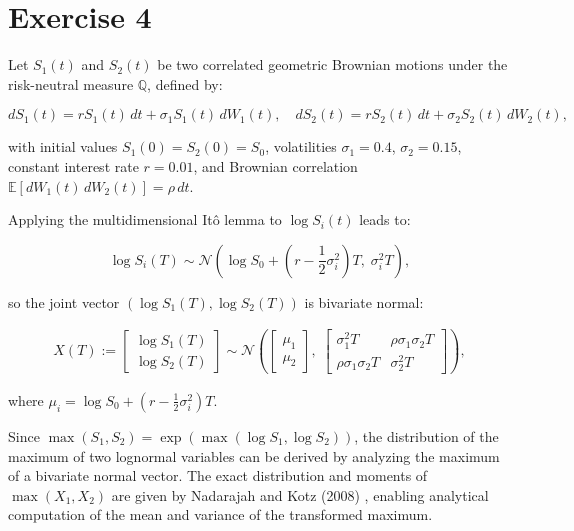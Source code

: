 \section{Exercise 4}

Let $S_1(t)$ and $S_2(t)$ be two correlated geometric Brownian motions under the risk-neutral measure $\mathbb{Q}$, defined by:

\begin{equation*}
dS_1(t) = r S_1(t)\,dt + \sigma_1 S_1(t)\,dW_1(t), \quad
dS_2(t) = r S_2(t)\,dt + \sigma_2 S_2(t)\,dW_2(t),
\end{equation*}

with initial values $S_1(0) = S_2(0) = S_0$, volatilities $\sigma_1 = 0.4$, $\sigma_2 = 0.15$, constant interest rate $r = 0.01$, and Brownian correlation $\mathbb{E}[dW_1(t)\,dW_2(t)] = \rho\,dt$.

\medskip
Applying the multidimensional Itô lemma to $\log S_i(t)$ leads to:

\begin{equation*}
\log S_i(T) \sim \mathcal{N}\left( \log S_0 + \left(r - \frac{1}{2} \sigma_i^2 \right) T,\; \sigma_i^2 T \right),
\end{equation*}

so the joint vector $(\log S_1(T), \log S_2(T))$ is bivariate normal:

\begin{align*}
X(T) := 
\begin{bmatrix} 
\log S_1(T) \\ 
\log S_2(T) 
\end{bmatrix}
\sim \mathcal{N} \left(
\begin{bmatrix}
\mu_1 \\ 
\mu_2
\end{bmatrix},\;
\begin{bmatrix}
\sigma_1^2 T & \rho \sigma_1 \sigma_2 T \\
\rho \sigma_1 \sigma_2 T & \sigma_2^2 T
\end{bmatrix}
\right),
\end{align*}

where $\mu_i = \log S_0 + \left(r - \frac{1}{2} \sigma_i^2\right)T$.

\medskip
Since $\max(S_1, S_2) = \exp(\max(\log S_1, \log S_2))$, the distribution of the maximum of two lognormal variables can be derived by analyzing the maximum of a bivariate normal vector. The exact distribution and moments of $\max(X_1, X_2)$ are given by Nadarajah and Kotz (2008) \cite{nadarajah2008}, enabling analytical computation of the mean and variance of the transformed maximum.

